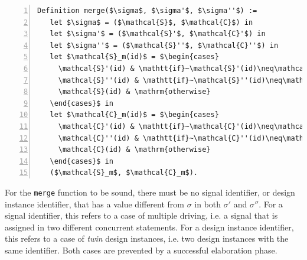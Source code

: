 \documentclass[pdflatex,sn-mathphys]{sn-jnl}%
\theoremstyle{thmstyleone}%
\theoremstyle{thmstyletwo}%
\theoremstyle{thmstylethree}%
\begin{document}
\begin{lstlisting}[language=PseudoCoq,
label={lst:merge-functionr},
caption={[The \texttt{merge} function.] The \texttt{merge} function that fuses together an origin state $\sigma$, with two states $\sigma'$ and $\sigma''$ generated by the execution of two \hvhdl{} concurrent statements.},
framexleftmargin=1.5em,
xleftmargin=2em,
numbers=left,
numberstyle=\tiny\ttfamily,
basicstyle=\fontsize{8}{10}\selectfont]
Definition merge($\sigma$, $\sigma'$, $\sigma''$) :=
   let $\sigma$ = ($\mathcal{S}$, $\mathcal{C}$) in
   let $\sigma'$ = ($\mathcal{S}'$, $\mathcal{C}'$) in
   let $\sigma''$ = ($\mathcal{S}''$, $\mathcal{C}''$) in
   let $\mathcal{S}_m(id)$ = $\begin{cases} 
     \mathcal{S}'(id) & \mathtt{if}~\mathcal{S}'(id)\neq\mathcal{S}(id) \\ 
     \mathcal{S}''(id) & \mathtt{if}~\mathcal{S}''(id)\neq\mathcal{S}(id) \\
     \mathcal{S}(id) & \mathrm{otherwise}
   \end{cases}$ in
   let $\mathcal{C}_m(id)$ = $\begin{cases} 
     \mathcal{C}'(id) & \mathtt{if}~\mathcal{C}'(id)\neq\mathcal{C}(id) \\ 
     \mathcal{C}''(id) & \mathtt{if}~\mathcal{C}''(id)\neq\mathcal{C}(id) \\
     \mathcal{C}(id) & \mathrm{otherwise}
   \end{cases}$ in 
   ($\mathcal{S}_m$, $\mathcal{C}_m$).
\end{lstlisting}

For the \texttt{merge} function to be sound, there must be no signal
identifier, or design instance identifier, that has a value different
from $\sigma$ in both $\sigma'$ and $\sigma''$. For a signal
identifier, this refers to a case of multiple driving, i.e. a signal
that is assigned in two different concurrent statements. For a design
instance identifier, this refers to a case of \textit{twin} design
instances, i.e. two design instances with the same identifier. Both
cases are prevented by a successful elaboration phase.

\end{document}
